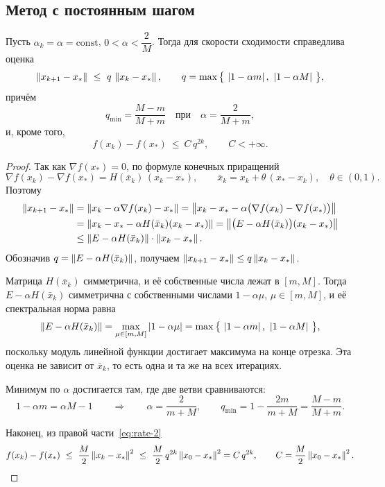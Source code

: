 \subsection{Метод с постоянным шагом}

\begin{theorem}\label{thm:const-step}
Пусть $\alpha_k = \alpha = \mathrm{const}$, $0 < \alpha < \dfrac{2}{M}$. Тогда для
скорости сходимости справедлива оценка
\[
  \left\lVert x_{k+1} - x_* \right\rVert \ \le\ q\, \left\lVert x_k - x_* \right\rVert ,
  \qquad
  q = \max\big\{\, \left\lvert 1 - \alpha m \right\rvert,\ \left\lvert 1 - \alpha M \right\rvert \,\big\} ,
\]
причём
\[
  q_{\min} = \frac{M - m}{M + m}
  \quad \text{при} \quad
  \alpha = \frac{2}{M + m} ,
\]
и, кроме того,
\[
  f(x_k) - f(x_*) \ \le\ C\, q^{2k} , \qquad C < +\infty .
\]
\end{theorem}

\begin{proof}
Так как $\nabla f(x_*) = 0$, по формуле конечных приращений
\[
  \nabla f(x_k) - \nabla f(x_*) = H(\bar{x}_k)\,(x_k - x_*) ,
  \qquad \bar{x}_k = x_k + \theta\,(x_* - x_k), \quad \theta \in (0,1) .
\]
Поэтому
\begin{align*}
  \left\lVert x_{k+1} - x_* \right\rVert
  &= \left\lVert x_k - \alpha \nabla f(x_k) - x_* \right\rVert
   = \left\lVert x_k - x_* - \alpha\big(\nabla f(x_k) - \nabla f(x_*)\big) \right\rVert \\
  &= \left\lVert x_k - x_* - \alpha H(\bar{x}_k)(x_k - x_*) \right\rVert
   = \left\lVert \big(E - \alpha H(\bar{x}_k)\big)(x_k - x_*) \right\rVert \\
  &\le \left\lVert E - \alpha H(\bar{x}_k) \right\rVert \cdot \left\lVert x_k - x_* \right\rVert .
\end{align*}
Обозначив $q = \left\lVert E - \alpha H(\bar{x}_k) \right\rVert$, получаем
$\left\lVert x_{k+1} - x_* \right\rVert \le q \left\lVert x_k - x_* \right\rVert$.

Матрица $H(\bar{x}_k)$ симметрична, и её собственные числа лежат в $[m, M]$.
Тогда $E - \alpha H(\bar{x}_k)$ симметрична с собственными числами
$1 - \alpha \mu$, $\mu \in [m, M]$, и её спектральная норма равна
\[
  \left\lVert E - \alpha H(\bar{x}_k) \right\rVert
  = \max_{\mu \in [m,M]} \left\lvert 1 - \alpha \mu \right\rvert
  = \max\big\{\, \left\lvert 1 - \alpha m \right\rvert,\ \left\lvert 1 - \alpha M \right\rvert \,\big\} ,
\]
поскольку модуль линейной функции достигает максимума на конце отрезка. Эта
оценка не зависит от $\bar{x}_k$, то есть одна и та же на всех итерациях.

Минимум по $\alpha$ достигается там, где две ветви сравниваются:
\[
  1 - \alpha m = \alpha M - 1
  \qquad\Longrightarrow\qquad
  \alpha = \frac{2}{m + M} ,
  \qquad
  q_{\min} = 1 - \frac{2m}{m+M} = \frac{M - m}{M + m} .
\]

Наконец, из правой части~\eqref{eq:rate-2}
\[
  f(x_k) - f(x_*) \ \le\ \frac{M}{2}\left\lVert x_k - x_* \right\rVert^2
  \ \le\ \frac{M}{2}\, q^{2k} \left\lVert x_0 - x_* \right\rVert^2 = C\, q^{2k} ,
  \qquad
  C = \frac{M}{2}\left\lVert x_0 - x_* \right\rVert^2 .
  \qedhere
\]
\end{proof}

